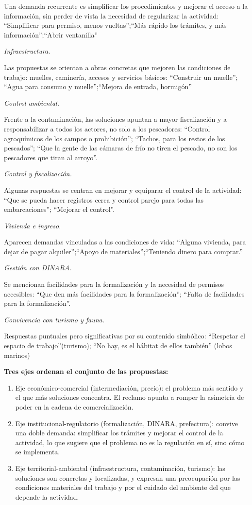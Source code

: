 \documentclass[
  letterpaper,
  DIV=11,
  numbers=noendperiod,
  justified]{scrreprt}
\begin{document}
Una demanda recurrente es simplificar los procedimientos y mejorar el
acceso a la información, sin perder de vista la necesidad de regularizar
la actividad: ``Simplificar para permiso, menos vueltas'';``Más rápido
los trámites, y más información'';``Abrir ventanilla''

\emph{Infraestructura.}

Las propuestas se orientan a obras concretas que mejoren las condiciones
de trabajo: muelles, caminería, accesos y servicios básicos: ``Construir
un muelle''; ``Agua para consumo y muelle'';``Mejora de entrada,
hormigón''

\emph{Control ambiental.}

Frente a la contaminación, las soluciones apuntan a mayor fiscalización
y a responsabilizar a todos los actores, no solo a los pescadores:
``Control agroquímicos de los campos o prohibición''; ``Tachos, para los
restos de los pescados''; ``Que la gente de las cámaras de frío no tiren
el pescado, no son los pescadores que tiran al arroyo''.

\emph{Control y fiscalización.}

Algunas respuestas se centran en mejorar y equiparar el control de la
actividad: ``Que se pueda hacer registros cerca y control parejo para
todas las embarcaciones''; ``Mejorar el control''.

\emph{Vivienda e ingreso.}

Aparecen demandas vinculadas a las condiciones de vida: ``Alguna
vivienda, para dejar de pagar alquiler'';``Apoyo de
materiales'';``Teniendo dinero para comprar.''

\emph{Gestión con DINARA.}

Se mencionan facilidades para la formalización y la necesidad de
permisos accesibles: ``Que den más facilidades para la formalización'';
``Falta de facilidades para la formalización''.

\emph{Convivencia con turismo y fauna.}

Respuestas puntuales pero significativas por su contenido simbólico:
``Respetar el espacio de trabajo''(turismo); ``No hay, es el hábitat de
ellos también'' (lobos marinos)

\textbf{Tres ejes ordenan el conjunto de las propuestas:}

\begin{enumerate}
\def\labelenumi{\arabic{enumi}.}
\item
  Eje económico-comercial (intermediación, precio): el problema más
  sentido y el que más soluciones concentra. El reclamo apunta a romper
  la asimetría de poder en la cadena de comercialización.
\item
  Eje institucional-regulatorio (formalización, DINARA, prefectura):
  convive una doble demanda: simplificar los trámites y mejorar el
  control de la actividad, lo que sugiere que el problema no es la
  regulación en sí, sino cómo se implementa.
\item
  Eje territorial-ambiental (infraestructura, contaminación, turismo):
  las soluciones son concretas y localizadas, y expresan una
  preocupación por las condiciones materiales del trabajo y por el
  cuidado del ambiente del que depende la actividad.
\end{enumerate}
\end{document}

